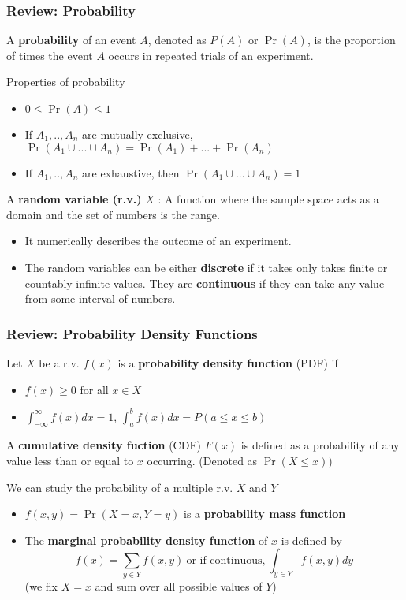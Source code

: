 \documentclass[compress]{beamer}
\newenvironment{wideitemize}{\itemize\addtolength{\itemsep}{10pt}}{\enditemize}
\begin{document}
\begin{frame}
\frametitle{Review: Probability}
\begin{wideitemize}
\item A \textbf{probability} of an event $A$, denoted as $P(A)$ or $\Pr(A)$, is the proportion of times the event $A$ occurs in repeated trials of an experiment.
\begin{block}{Properties of probability}
\begin{itemize}
\item $0\leq\Pr(A)\leq1$
\item If $A_1,..,A_n$ are mutually exclusive, $\Pr(A_1\cup ... \cup A_n)=\Pr(A_1)+...+\Pr(A_n)$
\item If $A_1,..,A_n$ are exhaustive, then $\Pr(A_1\cup ... \cup A_n)=1$
\end{itemize} 
\end{block}
\item A \textbf{random variable (r.v.)} $X$ : A function where the sample space acts as a domain and the set of numbers is the range. 
\begin{itemize}
\item It numerically describes the outcome of an experiment. 
\item The random variables can be either \textbf{discrete} if it takes only takes finite or countably infinite values. They are \textbf{continuous} if they can take any value from some interval of numbers. 
\end{itemize}
\end{wideitemize}
\end{frame}

\begin{frame}
\frametitle{Review: Probability Density Functions}
\begin{wideitemize}
\item Let $X$ be a r.v. $f(x)$ is a  \textbf{probability density function} (PDF) if 
\begin{itemize}
\item $f(x)\geq 0$ for all $x\in X$
\item $\int_{-\infty}^\infty f(x)dx=1$, $\int_{a}^b f(x)dx=P(a\leq x \leq b)$
\end{itemize}
\item A \textbf{cumulative density fuction} (CDF) $F(x)$ is defined as a probability of any value less than or equal to $x$ occurring. (Denoted as $\Pr(X\leq x)$)
\item We can study the probability of a multiple r.v. $X$ and $Y$ 
\begin{itemize}
\item $f(x,y) = \Pr(X=x, Y=y)$ is a \textbf{probability mass function}
\item The \textbf{marginal probability density function} of $x$ is defined by
\[
f(x) = \sum_{y\in Y}f(x,y) \ \text{or if continuous,} \ \int_{y\in Y}f(x,y)dy 
\]
(we fix $X=x$ and sum over all possible values of $Y$)
\end{itemize}
\end{wideitemize}
\end{frame}
\end{document}
